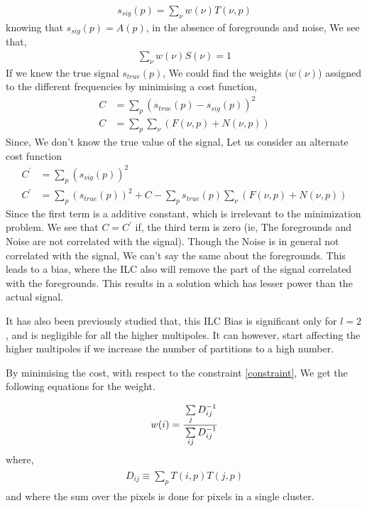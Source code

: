 \begin{align}
  s_{sig}(p) = \sum\limits_{\nu} w(\nu) T(\nu, p)
\end{align}
knowing that $s_{sig}(p) = A(p)$, in the absence of foregrounds and noise, We see that,
\begin{align}
  \label{constraint}
\sum\limits_\nu  w(\nu) S(\nu) = 1
\end{align}
If we knew the true signal $s_{true}(p)$, We could find the weights ($w(\nu)$) assigned to the
different frequencies by minimising a cost function,
\begin{align}
C &= \sum\limits_p \left( s_{true}(p) - s_{sig}(p) \right)^2\\
C &= \sum\limits_p \sum\limits_{\nu} \left(  F(\nu, p) + N(\nu, p) \right)
\end{align}
Since, We don't know the true value of the signal, Let us consider an alternate cost function
\begin{align}
C^\prime &= \sum\limits_p \left(s_{sig}(p) \right)^2\\
C^\prime &= \sum\limits_p (s_{true}(p))^2 + C - \sum\limits_p s_{true}(p) \sum\limits_{\nu} \left(F(\nu, p) + N(\nu, p)\right)
\end{align}
Since the first term is a additive constant, which is irrelevant to the minimization problem. We see that $C = C^\prime$ if,
the third term is zero (ie, The foregrounds and Noise are not correlated with the signal). Though the Noise is in general not
correlated with the signal, We can't say the same about the foregrounds. This leads to a bias, where the ILC also will remove the
part of the signal correlated with the foregrounds. This results in a solution which has lesser power than the actual signal. \cite{datarishi}

It has also been previously studied that, this ILC Bias is significant only for $l =2$, and is negligible for all the higher multipoles.
It can however, start affecting the higher multipoles if we increase the number of partitions to a high number. \cite{datarishi}

By minimising the cost, with respect to the constraint \eqref{constraint}, We get the following equations for the weight.

\begin{align}
  \begin{split}
    w(i) = \frac{\strut \sum\limits_j D_{ij}^{-1}}{\strut \sum\limits_{ij} D_{ij}^{-1}}
  \end{split}
\end{align}
where,
\begin{align}
  \begin{split}
    D_{ij} \equiv \sum\limits_p T(i, p)T(j, p) 
  \end{split}
\end{align}
and where the sum over the pixels is done for pixels in a single cluster.

